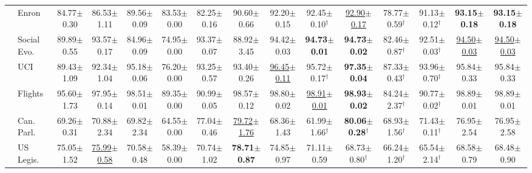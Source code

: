 \begin{table}[t]
{\begin{tabular}{llccccccccccccc}
 & Enron & 84.77{\scriptsize$\pm$0.30} & 86.53{\scriptsize$\pm$1.11} & 89.56{\scriptsize$\pm$0.09} & 83.53{\scriptsize$\pm$0.00} & 82.25{\scriptsize$\pm$0.16} & 90.60{\scriptsize$\pm$0.66} & 92.20{\scriptsize$\pm$0.15} & 92.45{\scriptsize$\pm$0.10}$^\dagger$ & \underline{92.90{\scriptsize$\pm$0.17}} & 78.77{\scriptsize$\pm$0.59}$^\dagger$ & 91.13{\scriptsize$\pm$0.12}$^\dagger$ & \textbf{93.15{\scriptsize$\pm$0.18}} & \textbf{93.15{\scriptsize$\pm$0.18}} \\
 & Social Evo. & 89.89{\scriptsize$\pm$0.55} & 93.57{\scriptsize$\pm$0.17} & 84.96{\scriptsize$\pm$0.09} & 74.95{\scriptsize$\pm$0.00} & 93.37{\scriptsize$\pm$0.07} & 88.92{\scriptsize$\pm$3.45} & 94.42{\scriptsize$\pm$0.03} & \textbf{94.73{\scriptsize$\pm$0.01}} & \textbf{94.73{\scriptsize$\pm$0.02}} & 82.46{\scriptsize$\pm$0.87}$^\dagger$ & 92.51{\scriptsize$\pm$0.03}$^\dagger$ & \underline{94.50{\scriptsize$\pm$0.03}} & \underline{94.50{\scriptsize$\pm$0.03}} \\
 & UCI & 89.43{\scriptsize$\pm$1.09} & 92.34{\scriptsize$\pm$1.04} & 95.18{\scriptsize$\pm$0.06} & 76.20{\scriptsize$\pm$0.00} & 93.25{\scriptsize$\pm$0.57} & 93.40{\scriptsize$\pm$0.26} & \underline{96.45{\scriptsize$\pm$0.11}} & 95.72{\scriptsize$\pm$0.17}$^\dagger$ & \textbf{97.35{\scriptsize$\pm$0.04}} & 87.33{\scriptsize$\pm$0.43}$^\dagger$ & 93.96{\scriptsize$\pm$0.70}$^\dagger$ & 95.84{\scriptsize$\pm$0.33} & 95.84{\scriptsize$\pm$0.33} \\
 & Flights & 95.60{\scriptsize$\pm$1.73} & 97.95{\scriptsize$\pm$0.14} & 98.51{\scriptsize$\pm$0.01} & 89.35{\scriptsize$\pm$0.00} & 90.99{\scriptsize$\pm$0.05} & 98.57{\scriptsize$\pm$0.12} & 98.80{\scriptsize$\pm$0.02} & \underline{98.91{\scriptsize$\pm$0.01}} & \textbf{98.93{\scriptsize$\pm$0.02}} & 84.24{\scriptsize$\pm$2.37}$^\dagger$ & 90.77{\scriptsize$\pm$0.02}$^\dagger$ & 98.89{\scriptsize$\pm$0.01} & 98.89{\scriptsize$\pm$0.01} \\
 & Can. Parl. & 69.26{\scriptsize$\pm$0.31} & 70.88{\scriptsize$\pm$2.34} & 69.82{\scriptsize$\pm$2.34} & 64.55{\scriptsize$\pm$0.00} & 77.04{\scriptsize$\pm$0.46} & \underline{79.72{\scriptsize$\pm$1.76}} & 68.36{\scriptsize$\pm$1.43} & 61.99{\scriptsize$\pm$1.66}$^\dagger$ & \textbf{80.06{\scriptsize$\pm$0.28}}$^\dagger$ & 68.93{\scriptsize$\pm$1.56}$^\dagger$ & 71.43{\scriptsize$\pm$0.11}$^\dagger$ & 76.95{\scriptsize$\pm$2.54} & 76.95{\scriptsize$\pm$2.58} \\
 & US Legis. & 75.05{\scriptsize$\pm$1.52} & \underline{75.99{\scriptsize$\pm$0.58}} & 70.58{\scriptsize$\pm$0.48} & 58.39{\scriptsize$\pm$0.00} & 70.74{\scriptsize$\pm$1.02} & \textbf{78.71{\scriptsize$\pm$0.87}} & 74.85{\scriptsize$\pm$0.97} & 71.11{\scriptsize$\pm$0.59} & 68.73{\scriptsize$\pm$0.80}$^\dagger$ & 66.24{\scriptsize$\pm$1.20}$^\dagger$ & 65.54{\scriptsize$\pm$2.14}$^\dagger$ & 68.58{\scriptsize$\pm$0.79} & 68.48{\scriptsize$\pm$0.90} \\

\end{tabular}}
\end{table}
